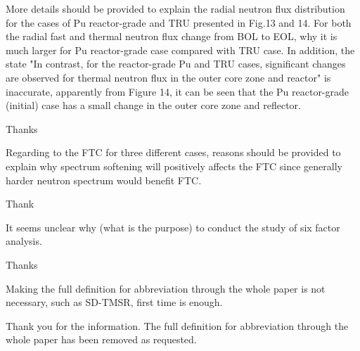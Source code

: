 \documentclass[answers,11pt]{exam}
\begin{document}
\begin{questions}
        \question More details should be provided to explain the radial neutron flux distribution for the cases of Pu reactor-grade and TRU presented in Fig.13 and 14. For both the radial fast and thermal neutron flux change from BOL to EOL, why it is much larger for Pu reactor-grade case compared with TRU case. In addition, the state "In contrast, for the reactor-grade Pu and TRU cases, significant changes are observed for thermal neutron flux in the outer core zone and reactor" is inaccurate, apparently from Figure 14, it can be seen that the Pu reactor-grade (initial) case has a small change in the outer core zone and reflector.
        \begin{solution}
                Thanks  
        \end{solution}

        \question Regarding to the FTC for three different cases, reasons should be provided to explain why spectrum softening will positively affects the FTC since generally harder neutron spectrum would benefit FTC.
        \begin{solution}
                Thank  
        \end{solution}

        \question It seems unclear why (what is the purpose) to conduct the study of six factor analysis.
        \begin{solution}
                 Thanks  
        \end{solution}

        \question Making the full definition for abbreviation through the whole paper is not necessary, such as SD-TMSR, first time is enough.
        
        \begin{solution}
                Thank you for the information. The full definition for abbreviation through the whole paper has been removed as requested.
        \end{solution}


        
        
\end{questions}


\end{document}
